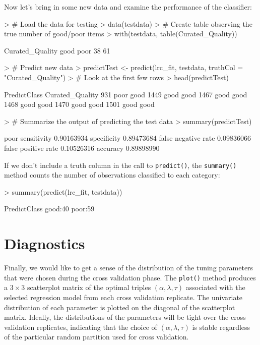 \documentclass{article}
\begin{document}
\noindent Now let's bring in some new data and examine the performance of the classifier:
\begin{Schunk}
\begin{Sinput}
> # Load the data for testing
> data(testdata)
> # Create table observing the true number of good/poor items 
> with(testdata, table(Curated_Quality))
\end{Sinput}
\begin{Soutput}
Curated_Quality
good poor 
  38   61 
\end{Soutput}
\begin{Sinput}
> # Predict new data
> predictTest <- predict(lrc_fit, testdata, truthCol = "Curated_Quality")
> # Look at the first few rows
> head(predictTest)
\end{Sinput}
\begin{Soutput}
     PredictClass Curated_Quality
931          poor            good
1449         good            good
1467         good            good
1468         good            good
1470         good            good
1501         good            good
\end{Soutput}
\begin{Sinput}
> # Summarize the output of predicting the test data
> summary(predictTest)
\end{Sinput}
\begin{Soutput}
                          poor
sensitivity         0.90163934
specificity         0.89473684
false negative rate 0.09836066
false positive rate 0.10526316
accuracy            0.89898990
\end{Soutput}
\end{Schunk}
\noindent If we don't include a truth column in the call to {\tt predict()}, the {\tt summary()} method 
counts the number of observations classified to each category:
\begin{Schunk}
\begin{Sinput}
> summary(predict(lrc_fit, testdata))
\end{Sinput}
\begin{Soutput}
 PredictClass
 good:40     
 poor:59     
\end{Soutput}
\end{Schunk}


\section{Diagnostics}

\noindent Finally, we would like to get a sense of the distribution of the tuning parameters that were chosen 
during the cross validation phase. The {\tt plot()} method produces a $3 \times 3$ scatterplot matrix of the optimal 
triples $\left(\alpha, \lambda, \tau\right)$ associated with the selected regression model from each cross 
validation replicate. The univariate distribution of each parameter is plotted on the diagonal of the 
scatterplot matrix.  Ideally, the distributions of the parameters will be tight over the cross validation 
replicates, indicating that the choice of $\left(\alpha, \lambda, \tau\right)$ is stable regardless of
the particular random partition used for cross validation.
\end{document}
